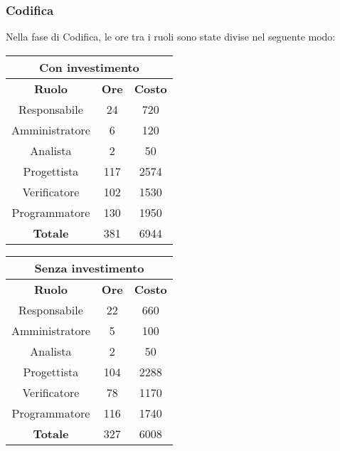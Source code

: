 \documentclass{scalatekids-article}
\begin{document}
\subsubsection{Codifica}
Nella fase di Codifica, le ore tra i ruoli sono state divise nel seguente modo:
\begin{center}
  \normalsize
  \begin{tabular}{| c | c | c |}
    \hline
    \multicolumn{3}{|c|}{\textbf{Con investimento}}\\
    \hline
    \textbf{Ruolo} & \textbf{Ore} & \textbf{Costo}\\
    \hline
    Responsabile & 24 & 720\\
    Amministratore & 6 & 120\\
    Analista & 2 & 50\\
    Progettista & 117 & 2574\\
    Verificatore & 102 & 1530 \\
    Programmatore & 130 & 1950 \\
    \hline
    \textbf{Totale} & 381 & 6944\\
    \hline
  \end{tabular}
  \qquad
  \begin{tabular}{| c | c | c |}
    \hline
    \multicolumn{3}{|c|}{\textbf{Senza investimento}}\\
    \hline
    \textbf{Ruolo} & \textbf{Ore} & \textbf{Costo}\\
    \hline
    Responsabile & 22 & 660\\
    Amministratore & 5 & 100\\
    Analista & 2 & 50\\
    Progettista & 104 & 2288\\
    Verificatore & 78 & 1170 \\
    Programmatore & 116 & 1740 \\
    \hline
    \textbf{Totale} & 327 & 6008 \\
    \hline
  \end{tabular}
\end{center}
\end{document}
